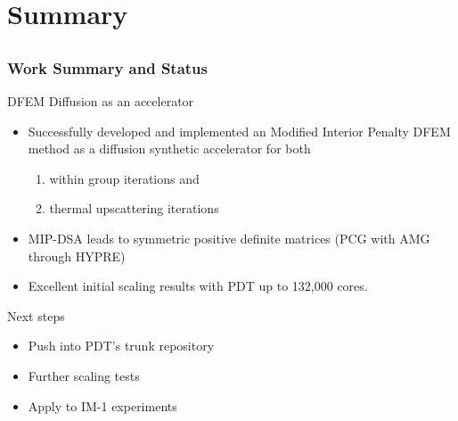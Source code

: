 \documentclass[compress,10pt]{beamer}
\begin{document}
\section{Summary}
\subsection{}

\begin{frame}[t]\frametitle{Work Summary and Status}

\begin{block}{DFEM Diffusion as an accelerator}
\begin{itemize}
\item Successfully developed and implemented an Modified Interior Penalty DFEM method as a diffusion synthetic accelerator for both \begin{enumerate}
\item within group iterations and 
\item thermal upscattering iterations
\end{enumerate}
\item MIP-DSA leads to symmetric positive definite matrices (PCG with AMG through HYPRE)
\item Excellent initial scaling results with PDT up to 132,000 cores.
\end{itemize}
\end{block}

\begin{block}{Next steps}
\begin{itemize}
\item Push into PDT's trunk repository
\item Further scaling tests
\item Apply to IM-1 experiments
\end{itemize}
\end{block}

\end{frame}
\typeout{***********************************************************************************}
\end{document}
